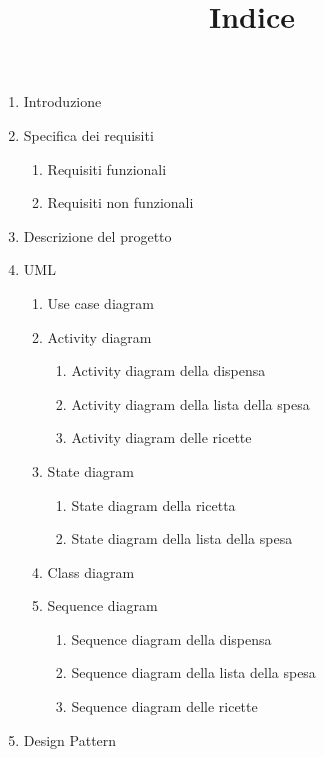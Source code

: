 \documentclass[
]{article}
\title{Indice}
\author{}
\date{}
\providecommand{\tightlist}{%
  \setlength{\itemsep}{0pt}\setlength{\parskip}{0pt}}
\begin{document}
\maketitle

\begin{enumerate}
\tightlist
\item
  Introduzione
\item
  Specifica dei requisiti

  \begin{enumerate}
  \tightlist
  \item
    Requisiti funzionali
  \item
    Requisiti non funzionali
  \end{enumerate}
\item
  Descrizione del progetto
\item
  UML

  \begin{enumerate}
  \tightlist
  \item
    Use case diagram
  \item
    Activity diagram

    \begin{enumerate}
    \tightlist
    \item
      Activity diagram della dispensa
    \item
      Activity diagram della lista della spesa
    \item
      Activity diagram delle ricette
    \end{enumerate}
  \item
    State diagram

    \begin{enumerate}
    \tightlist
    \item
      State diagram della ricetta
    \item
      State diagram della lista della spesa
    \end{enumerate}
  \item
    Class diagram
  \item
    Sequence diagram

    \begin{enumerate}
    \tightlist
    \item
      Sequence diagram della dispensa
    \item
      Sequence diagram della lista della spesa
    \item
      Sequence diagram delle ricette
    \end{enumerate}
  \end{enumerate}
\item
  Design Pattern


\end{enumerate}
\end{document}
